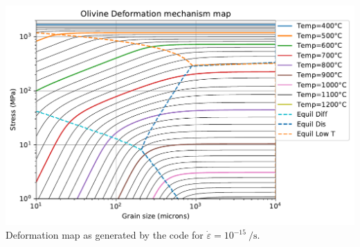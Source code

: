 \begin{center}
\includegraphics[width=16cm]{python_codes/fieldstone_121/results/deformation_map_1e-15.pdf}\\
{\captionfont Deformation map as generated by the code for $\dot\varepsilon=10^{-15}~\si{\per\second}$.}
\end{center}



